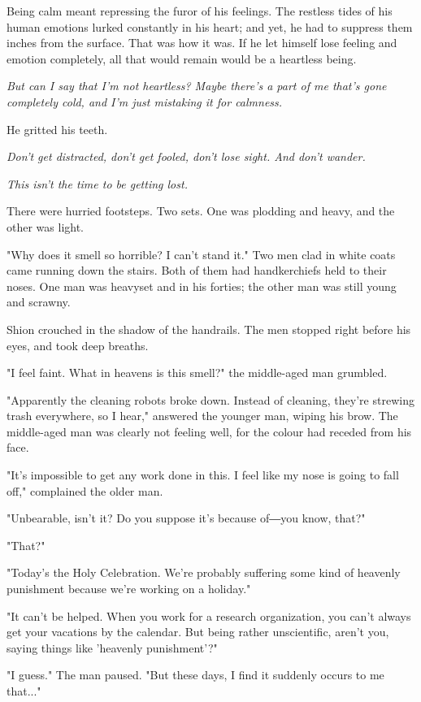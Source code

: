 Being calm meant repressing the furor of his feelings. The restless
tides of his human emotions lurked constantly in his heart; and yet, he
had to suppress them inches from the surface. That was how it was. If he
let himself lose feeling and emotion completely, all that would remain
would be a heartless being.

\emph{But can I say that I'm not heartless? Maybe there's a part of me that's
	gone completely cold, and I'm just mistaking it for calmness.}

He gritted his teeth.

\emph{Don't get distracted, don't get fooled, don't lose sight. And don't
	wander.}

\emph{This isn't the time to be getting lost.}

There were hurried footsteps. Two sets. One was plodding and heavy, and
the other was light.

"Why does it smell so horrible? I can't stand it." Two men clad in white
coats came running down the stairs. Both of them had handkerchiefs held
to their noses. One man was heavyset and in his forties; the other man
was still young and scrawny.

Shion crouched in the shadow of the handrails. The men stopped right
before his eyes, and took deep breaths.

"I feel faint. What in heavens is this smell?" the middle-aged man
grumbled.

"Apparently the cleaning robots broke down. Instead of cleaning, they're
strewing trash everywhere, so I hear," answered the younger man, wiping
his brow. The middle-aged man was clearly not feeling well, for the
colour had receded from his face.

"It's impossible to get any work done in this. I feel like my nose is
going to fall off," complained the older man.

"Unbearable, isn't it? Do you suppose it's because of―you know, that?"

"That?"

"Today's the Holy Celebration. We're probably suffering some kind of
heavenly punishment because we're working on a holiday."

"It can't be helped. When you work for a research organization, you
can't always get your vacations by the calendar. But being rather
unscientific, aren't you, saying things like 'heavenly punishment'?"

"I guess." The man paused. "But these days, I find it suddenly occurs to
me that..."

